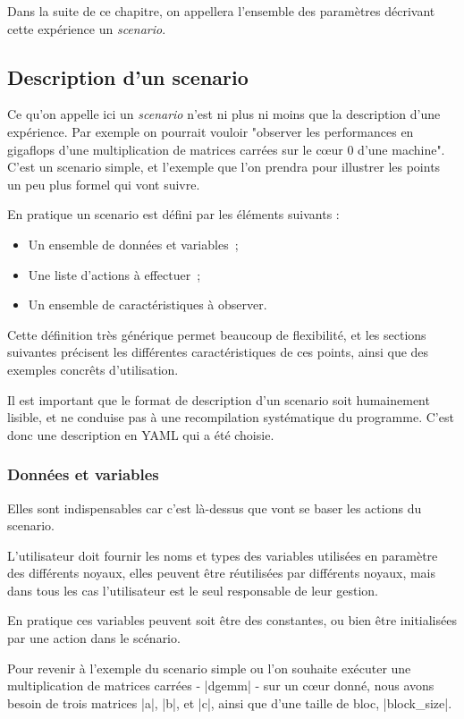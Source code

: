Dans la suite de ce chapitre, on appellera l'ensemble des paramètres décrivant cette expérience un \emph{scenario}.

\subsection{Description d'un scenario}

Ce qu'on appelle ici un \emph{scenario} n'est ni plus ni moins que la description d'une expérience.
Par exemple on pourrait vouloir "observer les performances en gigaflops d'une multiplication de matrices carrées sur le cœur 0 d'une machine".
C'est un scenario simple, et l'exemple que l'on prendra pour illustrer les points un peu plus formel qui vont suivre.

En pratique un scenario est défini par les éléments suivants :
\begin{itemize}
 \item Un ensemble de données et variables~;
 \item Une liste d'actions à effectuer~;
 \item Un ensemble de caractéristiques à observer.
\end{itemize}

Cette définition très générique permet beaucoup de flexibilité, et les sections suivantes précisent les différentes caractéristiques de ces points, ainsi que des exemples concrêts d'utilisation.

Il est important que le format de description d'un scenario soit humainement lisible, et ne conduise pas à une recompilation systématique du programme. C'est donc une description en YAML qui a été choisie.

\subsubsection{Données et variables}

Elles sont indispensables car c'est là-dessus que vont se baser les actions du scenario.

L'utilisateur doit fournir les noms et types des variables utilisées en paramètre des différents noyaux, elles peuvent être réutilisées par différents noyaux, mais dans tous les cas l'utilisateur est le seul responsable de leur gestion.

En pratique ces variables peuvent soit être des constantes, ou bien être initialisées par une action dans le scénario.

Pour revenir à l'exemple du scenario simple ou l'on souhaite exécuter une multiplication de matrices carrées - |dgemm| - sur un cœur donné, nous avons besoin de trois matrices |a|, |b|, et |c|, ainsi que d'une taille de bloc, |block_size|.

